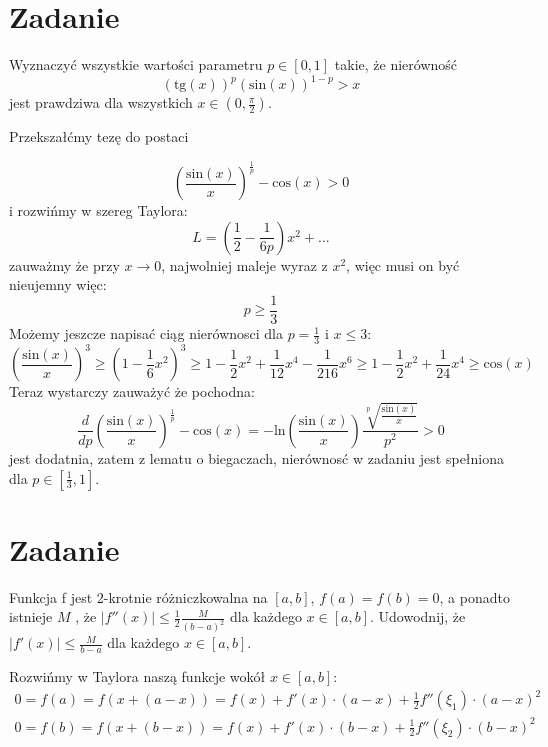 \documentclass[12pt]{scrartcl}
\begin{document}
    \section{Zadanie}
        
    \begin{zadanie}
        Wyznaczyć wszystkie wartości parametru $p \in [0, 1]$ takie, że nierówność
        \[
          \left ( \text{tg} \left ( x \right )  \right )^p \left ( \text{sin} \left ( x \right )  \right )^{1-p} > x
        \]
        jest prawdziwa dla wszystkich $x \in (0, \frac{\pi }{2} )$.
    \end{zadanie}
    
    Przekszałćmy tezę do postaci

    \[
      \left ( \frac{\text{sin} \left ( x \right ) }{x} \right )^{\frac{1}{p}} - \text{cos} \left ( x \right ) > 0 
    \]
    i rozwińmy w szereg Taylora:
    \[
        L = \left ( \frac{1}{2} - \frac{1}{6p} \right ) x^2 + ...
    \]
    zauważmy że przy $x \to 0$, najwolniej maleje wyraz z $x^2$, więc musi on być nieujemny więc:
    \[
        p \geq \frac{1}{3}
    \]
    Możemy jeszcze napisać ciąg nierównosci dla $p = \frac{1}{3}$ i $x \leq 3$:
     \[
        \left ( \frac{\text{sin} \left ( x \right ) }{x} \right )^3 \geq \left ( 1 - \frac{1}{6} x^2 \right )^3 \geq 1 - \frac{1}{2} x^2 + \frac{1}{12} x^4 - \frac{1}{216} x^6 \geq 1 - \frac{1}{2} x^2 + \frac{1}{24} x^4 \geq \text{cos} \left ( x \right )  
    \]
    Teraz wystarczy zauważyć że pochodna:
    \[
      \frac{d}{dp} \left ( \frac{\text{sin} \left ( x \right ) }{x} \right )^{\frac{1}{p}} - \text{cos} \left ( x \right ) = - \text{ln} \left ( \frac{\text{sin} \left ( x \right ) }{x} \right ) \frac{\sqrt[p]{\frac{\text{sin} \left ( x \right ) }{x}} }{p^2} > 0
    \]
    jest dodatnia, zatem z lematu o biegaczach, nierównosć w zadaniu jest spełniona dla $p \in [ \frac{1}{3}, 1] $.
    \section{Zadanie}
        
    \begin{zadanie}
        Funkcja f jest 2-krotnie różniczkowalna na $[a, b]$, $f (a) = f (b) = 0$, a ponadto istnieje $M$ , że $|f''(x)| \leq \frac{1}{2} \frac{M}{(b-a)^2}$ dla każdego $x \in [a, b]$. Udowodnij, że $|f '(x)| \leq \frac{M}{b-a}$ dla każdego $x \in [a, b]$.
    \end{zadanie}
    
    Rozwińmy w Taylora naszą funkcje wokół $x \in [a,b]$:
    \begin{gather*}
        0 = f(a) = f(x + (a-x)) = f(x) + f'(x) \cdot (a-x) + \frac{1}{2} f''(\xi_1) \cdot (a-x)^2 \\
        0 = f(b) = f(x + (b-x)) = f(x) + f'(x) \cdot (b-x) + \frac{1}{2} f''(\xi_2) \cdot (b-x)^2 
    \end{gather*}
    
\end{document}
